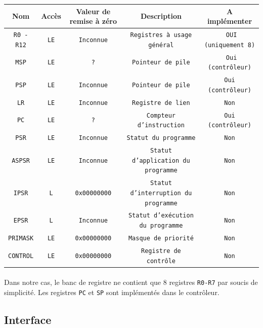 \begin{tabular}{|c|c|c|c|c|}
\hline
\textbf{Nom} 	 & \textbf{Accès}              & \textbf{Valeur de remise à zéro} & \textbf{Description} & \textbf{A implémenter}\\
\hline
\texttt{R0 - R12} &  \texttt{LE} &  \texttt{Inconnue}		  &  \texttt{Registres à usage général} &  \texttt{ OUI (uniquement 8)}\\
\hline
\texttt{MSP} 	 &  \texttt{LE} &  \texttt{?} 			  &  \texttt{Pointeur de pile} &  \texttt{ Oui (contrôleur)}\\
\hline
\texttt{PSP}	 &  \texttt{LE} &  \texttt{Inconnue} 		  &  \texttt{Pointeur de pile} &  \texttt{Oui (contrôleur)}\\
\hline
\texttt{LR} 	 &  \texttt{LE} &  \texttt{Inconnue} 		  &  \texttt{Registre de lien} &  \texttt{Non}\\
\hline
\texttt{PC} 	 &  \texttt{LE} &  \texttt{?} 			  &  \texttt{Compteur d'instruction} &  \texttt{Oui (contrôleur)}\\
\hline
\texttt{PSR} 	 &  \texttt{LE} &  \texttt{Inconnue} 		  &  \texttt{Statut du programme} &  \texttt{Non}\\
\hline
\texttt{ASPSR} 	 &  \texttt{LE} &  \texttt{Inconnue} 		  &  \texttt{Statut d'application du programme} &  \texttt{Non}\\
\hline
\texttt{IPSR} 	 &  \texttt{L}      &  \texttt{0x00000000} 		  &  \texttt{Statut d'interruption du programme} &  \texttt{Non}\\
\hline
\texttt{EPSR} 	 &  \texttt{L}      &  \texttt{Inconnue} 		  &  \texttt{Statut d'exécution du programme} &  \texttt{Non}\\
\hline
\texttt{PRIMASK}  &  \texttt{LE} &  \texttt{0x00000000} 		  &  \texttt{Masque de priorité} &  \texttt{Non}\\
\hline
\texttt{CONTROL}  &  \texttt{LE} &  \texttt{0x00000000} 		  &  \texttt{Registre de contrôle} &  \texttt{Non}\\
\hline
\end{tabular}

\paragraph{}
Dans notre cas, le banc de registre ne contient que 8 registres \texttt{R0-R7} par soucis de simplicité. Les registres \texttt{PC} et \texttt{SP} sont implémentés dans le contrôleur.



\subsection{Interface}

